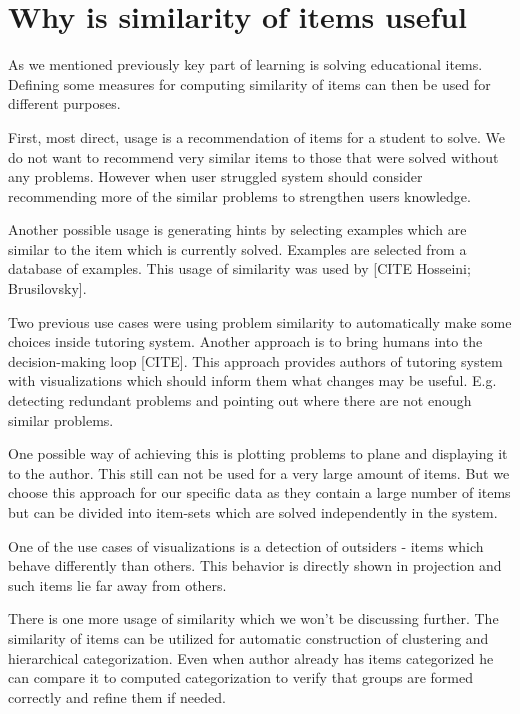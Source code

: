 \documentclass[
  digital, %
  table,   %
  nolof,     %
  nolot,     %
  nocover,
  color
]{fithesis3}
\begin{document}

\section{Why is similarity of items useful}\label{why-is-similarity-of-items-useful}


As we mentioned previously key part of learning is solving educational items. Defining some measures for computing similarity of items can then be used for different purposes.

First, most direct, usage is a recommendation of items for a student to solve. We do not want to recommend very similar items to those that were solved without any problems. However when user struggled system should consider recommending more of the similar problems to strengthen users knowledge.

Another possible usage is generating hints by selecting examples which are similar to the item which is currently solved. Examples are selected from a database of examples. This usage of similarity was used by [CITE Hosseini; Brusilovsky].

Two previous use cases were using problem similarity to automatically make some choices inside tutoring system. Another approach is to bring humans into the decision-making loop [CITE]. This approach provides authors of tutoring system with visualizations which should inform them what changes may be useful. E.g. detecting redundant problems and pointing out where there are not enough similar problems.

One possible way of achieving this is plotting problems to plane and displaying it to the author. This still can not be used for a very large amount of items. But we choose this approach for our specific data as they contain a large number of items but can be divided into item-sets which are solved independently in the system.

One of the use cases of visualizations is a detection of outsiders - items which behave differently than others. This behavior is directly shown in projection and such items lie far away from others.

There is one more usage of similarity which we won't be discussing further. The similarity of items can be utilized for automatic construction of clustering and hierarchical categorization. Even when author already has items categorized he can compare it to computed categorization to verify that groups are formed correctly and refine them if needed.
\end{document}
